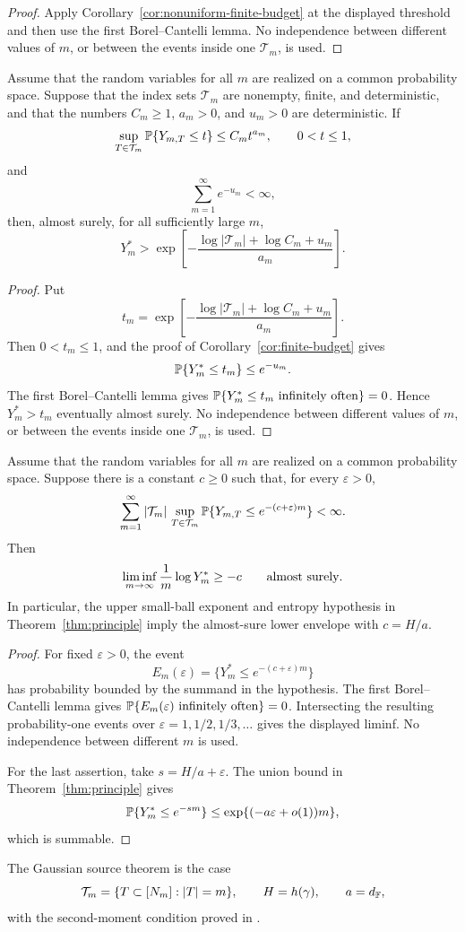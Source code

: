\begin{proof}
Apply Corollary~\ref{cor:nonuniform-finite-budget} at the displayed threshold
and then use the first Borel--Cantelli lemma.  No independence between
different values of \(m\), or between the events inside one \(\mathcal T_m\),
is used.
\end{proof}

\begin{corollary}\label{cor:as-finite-budget}
Assume that the random variables for all \(m\) are realized on a common
probability space.  Suppose that the index sets \(\mathcal T_m\) are nonempty,
finite, and deterministic, and that the numbers \(C_m\ge1\), \(a_m>0\), and
\(u_m>0\) are deterministic.  If
\[
  \sup_{T\in\mathcal T_m}\mathbb{P}\{Y_{m,T}\le t\}\le C_m t^{a_m},
  \qquad 0<t\le1,
\]
and
\[
  \sum_{m=1}^\infty e^{-u_m}<\infty,
\]
then, almost surely, for all sufficiently large \(m\),
\[
  Y_m^*>
  \exp\left[-\frac{\log|\mathcal T_m|+\log C_m+u_m}{a_m}\right].
\]
\end{corollary}

\begin{proof}
Put
\[
  t_m=\exp\left[-\frac{\log|\mathcal T_m|+\log C_m+u_m}{a_m}\right].
\]
Then \(0<t_m\le1\), and the proof of Corollary~\ref{cor:finite-budget} gives
\[
  \mathbb{P}\{Y_m^*\le t_m\}\le e^{-u_m}.
\]
The first Borel--Cantelli lemma gives
\(\PP\{Y_m^*\le t_m\ {\rm infinitely\ often}\}=0\).  Hence
\(Y_m^*>t_m\) eventually almost surely.  No independence between different
values of \(m\), or between the events inside one \(\mathcal T_m\), is used.
\end{proof}

\begin{corollary}\label{cor:as-lower-envelope}
Assume that the random variables for all \(m\) are realized on a common
probability space.  Suppose there is a constant \(c\ge0\) such that, for every
\(\varepsilon>0\),
\[
  \sum_{m=1}^\infty
  |\mathcal T_m|\,
  \sup_{T\in\mathcal T_m}
  \mathbb{P}\{Y_{m,T}\le e^{-(c+\varepsilon)m}\}<\infty .
\]
Then
\[
  \liminf_{m\to\infty}\frac1m\log Y_m^*\ge -c
  \qquad\hbox{almost surely}.
\]
In particular, the upper small-ball exponent and entropy hypothesis in
Theorem~\ref{thm:principle} imply the almost-sure lower envelope with
\(c=H/a\).
\end{corollary}

\begin{proof}
For fixed \(\varepsilon>0\), the event
\[
  E_m(\varepsilon)=\{Y_m^*\le e^{-(c+\varepsilon)m}\}
\]
has probability bounded by the summand in the hypothesis.  The first
Borel--Cantelli lemma gives \(\mathbb{P}\{E_m(\varepsilon)\ \hbox{infinitely often}\}=0\).
Intersecting the resulting probability-one events over
\(\varepsilon=1,1/2,1/3,\ldots\) gives the displayed liminf.  No independence
between different \(m\) is used.

For the last assertion, take \(s=H/a+\varepsilon\).  The union bound in
Theorem~\ref{thm:principle} gives
\[
  \mathbb{P}\{Y_m^*\le e^{-sm}\}\le \exp\{(-a\varepsilon+o(1))m\},
\]
which is summable.
\end{proof}

The Gaussian source theorem is the case
\[
  \mathcal T_m=\{T\subset[N_m]: |T|=m\},\qquad
  H=h(\gamma),\qquad
  a=d_{\mathbb{F}},
\]
with the second-moment condition proved in \cite{ShmaloExtremal2026}.

